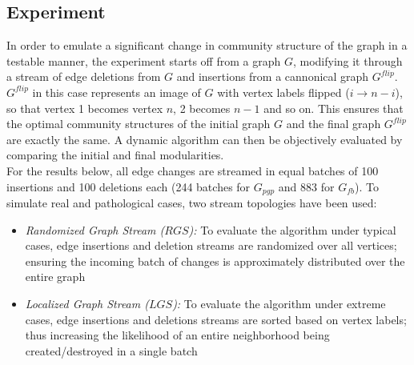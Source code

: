 \documentclass[conference]{IEEEtran}
\begin{document}
\subsection{Experiment}
In order to emulate a significant change in community structure of the graph in 
a testable manner, the experiment starts off from a graph $G$, modifying it 
through a stream of edge deletions from $G$ and insertions from a cannonical 
graph $G^{flip}$. $G^{flip}$ in this case represents an image of $G$ with 
vertex labels flipped ($i \rightarrow n-i$), so that vertex 1 becomes vertex 
$n$, 2 becomes $n-1$ and so on. This ensures that the optimal community 
structures of the initial graph $G$ and the final graph $G^{flip}$ are exactly 
the same. A dynamic algorithm can then be objectively evaluated by comparing 
the initial and final modularities.\\
For the results below, all edge changes are streamed in equal batches of 100 
insertions and 100 deletions each (244 batches for $G_{pgp}$ and 883 for 
$G_{fb}$). To simulate real and pathological cases, two 
stream topologies have been used:
\begin{itemize}
 \item \emph{Randomized Graph Stream ($RGS$):} To evaluate the algorithm under 
typical cases, edge insertions and deletion streams are randomized over all 
vertices; ensuring the incoming batch of changes is approximately distributed 
over the entire graph
 \item \emph{Localized Graph Stream ($LGS$):} To evaluate the algorithm under 
extreme cases, edge insertions and deletions streams are sorted based on vertex 
labels; thus increasing the likelihood of an entire neighborhood being 
created/destroyed in a single batch
\end{itemize}
\end{document}
